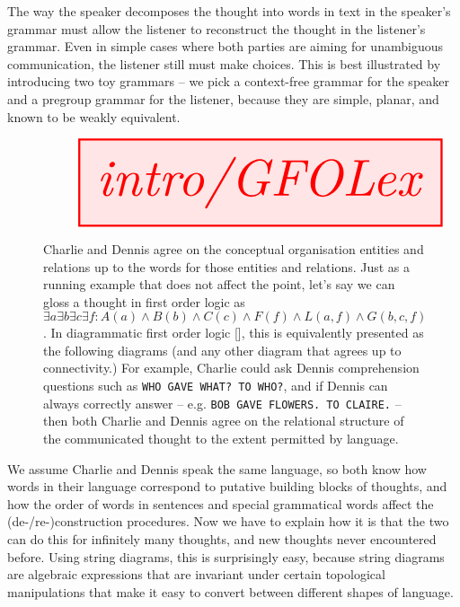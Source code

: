 The way the speaker decomposes the thought into words in text in the speaker's grammar must allow the listener to reconstruct the thought in the listener's grammar. Even in simple cases where both parties are aiming for unambiguous communication, the listener still must make choices. This is best illustrated by introducing two toy grammars -- we pick a context-free grammar for the speaker and a pregroup grammar for the listener, because they are simple, planar, and known to be weakly equivalent.

\begin{figure}[h!]\label{fig:GFOLex}
\centering
\[\resizebox{\textwidth}{!}{\tikzfig{intro/GFOLex}}\]
\caption{Charlie and Dennis agree on the conceptual organisation entities and relations up to the words for those entities and relations. Just as a running example that does not affect the point, let's say we can gloss a thought in first order logic as $\exists a \exists b \exists c \exists f : A(a) \wedge B(b) \wedge C(c) \wedge F(f) \wedge L(a,f) \wedge G(b,c,f)$. In diagrammatic first order logic [], this is equivalently presented as the following diagrams (and any other diagram that agrees up to connectivity.) For example, Charlie could ask Dennis comprehension questions such as \texttt{WHO GAVE WHAT? TO WHO?}, and if Dennis can always correctly answer -- e.g. \texttt{BOB GAVE FLOWERS. TO CLAIRE.} -- then both Charlie and Dennis agree on the relational structure of the communicated thought to the extent permitted by language.}
\end{figure}

We assume Charlie and Dennis speak the same language, so both know how words in their language correspond to putative building blocks of thoughts, and how the order of words in sentences and special grammatical words affect the (de-/re-)construction procedures. Now we have to explain how it is that the two can do this for infinitely many thoughts, and new thoughts never encountered before. Using string diagrams, this is surprisingly easy, because string diagrams are algebraic expressions that are invariant under certain topological manipulations that make it easy to convert between different shapes of language.

